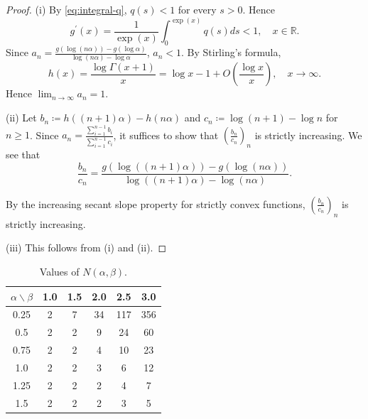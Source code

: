 \documentclass[a4paper, reqno, 11pt]{amsart}
\theoremstyle{definition}
\begin{document}
\begin{proof}
(i) By \eqref{eq:integral-q}, $q(s) < 1$ for every $s > 0$. 
Hence 
\[ g^{\prime}(x) = \frac{1}{\exp(x)} \int_0^{\exp(x)} q(s) ds < 1, \quad x \in \mathbb{R}. \] 
Since $a_n = \frac{g(\log (n\alpha)) - g(\log \alpha)}{\log(n \alpha) - \log \alpha}$, $a_n < 1$. 
By Stirling's formula, 
\[ h(x) = \frac{\log \Gamma(x+1)}{x} = \log x - 1 + O\left(\frac{\log x}{x} \right), \quad x \to \infty. \]
Hence $\lim_{n \to \infty} a_n = 1$. 

(ii) Let $b_n \coloneqq h((n+1) \alpha) -h(n\alpha)$ and $c_n \coloneqq \log (n+1) - \log n$ for $n \ge 1$. 
Since $a_n = \frac{\sum_{i=1}^{n-1} b_i}{\sum_{i=1}^{n-1} c_i}$, it suffices to show that $\left(\frac{b_n}{c_n} \right)_n$ is strictly increasing. 
We see that 
\[ \frac{b_n}{c_n} = \frac{g(\log((n+1)\alpha)) - g(\log(n\alpha))}{\log((n+1)\alpha) - \log(n\alpha)}. \]

By the increasing secant slope property for strictly convex functions, 
$\left(\frac{b_n}{c_n} \right)_n$ is strictly increasing. 


(iii) This follows from (i) and (ii). 
\end{proof}


\begin{table}[H]
\centering
\begin{tabular}{|c|ccccc|}
\hline
 $\alpha \backslash \beta$ &  1.0 & 1.5 & 2.0 & 2.5 & 3.0  \\
\hline
0.25 &  2 & 7 &  34 &  117 & 356  \\
0.5 &    2 & 2 &  9 &  24  & 60 \\
0.75 &  2 & 2 &  4 &  10 & 23  \\
1.0 &    2 &  2 &  3 &  6 & 12  \\
1.25 &  2 & 2 &  2 &  4 & 7  \\
1.5 &    2 &  2 &  2 &  3  & 5\\
\hline  
\end{tabular}
\caption{Values of $N(\alpha,\beta)$.}\label{tab:CI3}
\end{table}
\end{document}
